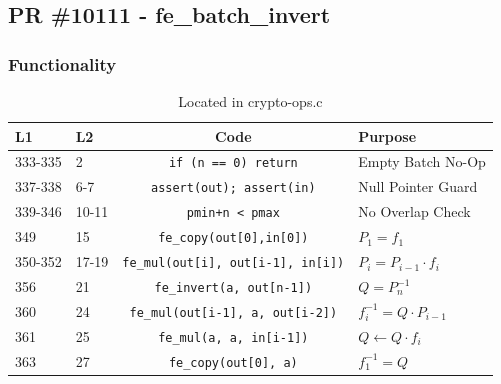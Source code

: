 \documentclass[12pt,titlepage,table]{article}
\begin{document}
\newpage
\subsection{PR \#10111 - fe\_batch\_invert}
\subsubsection{Functionality}


\begin{table}[htbp]
\centering
\caption{fe\_batch\_inverse Source To Spec Map}
{
\begin{tabular}{| l | l | c | l |}
\hline
\textbf{L1} & \textbf{L2} & \textbf{Code} & \textbf{Purpose} \\
\hline
\hline
333-335 & 2 & \verb+if (n == 0) return+ & Empty Batch No-Op \\
337-338 & 6-7 & \verb+assert(out); assert(in)+ & Null Pointer Guard \\
339-346 & 10-11 & \verb|pmin+n < pmax| & No Overlap Check \\
349 & 15 & \verb|fe_copy(out[0],in[0])| & $P_1 = f_1$ \\
350-352 & 17-19 &\verb|fe_mul(out[i], out[i-1], in[i])| & $P_i = P_{i - 1} \cdot f_i$ \\
356 & 21 &\verb|fe_invert(a, out[n-1])| & $Q = P_n^{-1}$ \\
360 & 24 &\verb|fe_mul(out[i-1], a, out[i-2])| & $f_i^{-1} = Q \cdot P_{i-1}$\\
361 & 25 &\verb|fe_mul(a, a, in[i-1])| & $Q \leftarrow Q \cdot f_i$\\
363 & 27 &\verb|fe_copy(out[0], a)| & $f_1^{-1} = Q$\\
\hline
\end{tabular}}
\caption*{Located in crypto-ops.c}
\end{table}

\newpage
\end{document}
